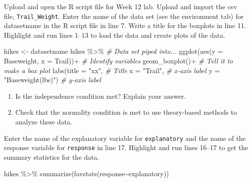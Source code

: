 \documentclass[
]{report}
\newenvironment{Shaded}{\begin{snugshade}}{\end{snugshade}}
\newcommand{\AttributeTok}[1]{\textcolor[rgb]{0.77,0.63,0.00}{#1}}
\newcommand{\CommentTok}[1]{\textcolor[rgb]{0.56,0.35,0.01}{\textit{#1}}}
\newcommand{\FunctionTok}[1]{\textcolor[rgb]{0.00,0.00,0.00}{#1}}
\newcommand{\NormalTok}[1]{#1}
\newcommand{\OtherTok}[1]{\textcolor[rgb]{0.56,0.35,0.01}{#1}}
\newcommand{\SpecialCharTok}[1]{\textcolor[rgb]{0.00,0.00,0.00}{#1}}
\newcommand{\StringTok}[1]{\textcolor[rgb]{0.31,0.60,0.02}{#1}}
\begin{document}
Upload and open the R script file for Week 12 lab. Upload and import the csv file, \texttt{Trail\_Weight}. Enter the name of the data set (see the environment tab) for datasetname in the R script file in line 7. Write a title for the boxplots in line 11. Highlight and run lines 1--13 to load the data and create plots of the data.

\begin{Shaded}
\begin{Highlighting}[]
\NormalTok{hikes }\OtherTok{\textless{}{-}}\NormalTok{ datasetname}
\NormalTok{hikes }\SpecialCharTok{\%\textgreater{}\%}  \CommentTok{\# Data set piped into...}
  \FunctionTok{ggplot}\NormalTok{(}\FunctionTok{aes}\NormalTok{(}\AttributeTok{y =}\NormalTok{ Baseweight, }\AttributeTok{x =}\NormalTok{ Trail))}\SpecialCharTok{+}  \CommentTok{\# Identify variables}
  \FunctionTok{geom\_boxplot}\NormalTok{()}\SpecialCharTok{+}  \CommentTok{\# Tell it to make a box plot}
  \FunctionTok{labs}\NormalTok{(}\AttributeTok{title =} \StringTok{"xx"}\NormalTok{,  }\CommentTok{\# Title}
       \AttributeTok{x =} \StringTok{"Trail"}\NormalTok{,    }\CommentTok{\# x{-}axis label}
       \AttributeTok{y =} \StringTok{"Baseweight(lbs)"}\NormalTok{)  }\CommentTok{\# y{-}axis label}
\end{Highlighting}
\end{Shaded}

\begin{enumerate}
\def\labelenumi{\arabic{enumi}.}
\setcounter{enumi}{3}
\item
  Is the independence condition met? Explain your answer.
  \vspace{0.8in}
\item
  Check that the normality condition is met to use theory-based methods to analyze these data.
\end{enumerate}

\vspace{0.8in}

\newpage

Enter the name of the explanatory variable for \texttt{explanatory} and the name of the response variable for \texttt{response} in line 17. Highlight and run lines 16--17 to get the summary statistics for the data.

\begin{Shaded}
\begin{Highlighting}[]
\NormalTok{hikes }\SpecialCharTok{\%\textgreater{}\%}
  \FunctionTok{summarize}\NormalTok{(}\FunctionTok{favstats}\NormalTok{(response}\SpecialCharTok{\textasciitilde{}}\NormalTok{explanatory))}
\end{Highlighting}
\end{Shaded}
\end{document}
